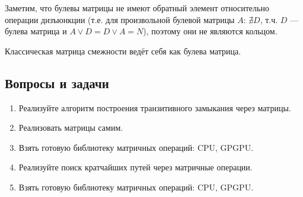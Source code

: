 Заметим, что булевы матрицы не имеют обратный элемент относительно операции дизъюнкции (т.е. для произвольной булевой матрицы $A$: $\nexists D$, т.ч. $D$ --- булева матрица и $A \vee D = D \vee A = N$), поэтому они не являются кольцом.

Классическая матрица смежности ведёт себя как булева матрица.

\subsection{Вопросы и задачи}
\begin{enumerate}
  \item Реализуйте алгоритм построения транзитивного замыкания через матрицы.
  \item Реализовать матрицы самим.
  \item Взять готовую библиотеку матричных операций: CPU, GPGPU.
  \item Реализуйте поиск кратчайших путей через матричные операции.
  \item Взять готовую библиотеку матричных операций: CPU, GPGPU.
\end{enumerate}